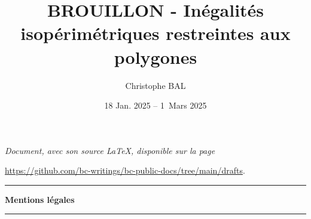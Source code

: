 \documentclass[12pt]{amsart}
\begin{document}
\title{BROUILLON - Inégalités isopérimétriques restreintes aux polygones}
\author{Christophe BAL}
\date{18 Jan. 2025 -- 1\ier\ Mars 2025}

\maketitle

\begin{center}
	\itshape
	Document, avec son source \LaTeX, disponible sur la page

	\url{https://github.com/bc-writings/bc-public-docs/tree/main/drafts}.
\end{center}


\bigskip


\begin{center}
	\hrule\vspace{.3em}
	{
		\fontsize{1.35em}{1em}\selectfont
		\textbf{Mentions \og légales \fg}
	}

	\vspace{0.45em}
	\doclicenseThis
	\hrule
\end{center}



\setcounter{tocdepth}{2}
\tableofcontents




\newpage
\end{document}
